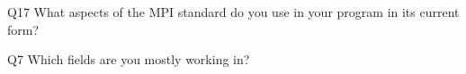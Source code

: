 \begin{description}%
\item{Q17} What aspects of the MPI standard do you use in your program in its current form?%
\item{Q7} Which fields are you mostly working in?%
\end{description}%
